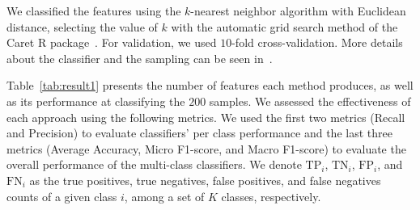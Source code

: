 We classified the features using the $k$-nearest neighbor algorithm with Euclidean distance, selecting the value of $k$ with the automatic grid search method of the Caret R package~\cite{kuhn2008building}.
For validation, we used $10$-fold cross-validation.
More details about the classifier and the sampling can be seen in~\cite{mitchell1997machine}.

Table~\ref{tab:result1} presents the number of features each method produces, as well as its performance at classifying the $200$ samples.
We assessed the effectiveness of each approach using the following metrics. We used the first two metrics (Recall and Precision) to evaluate classifiers' per class performance and the last three metrics (Average Accuracy, Micro F1-score, and Macro F1-score) to evaluate the overall performance of the multi-class classifiers. We denote $\text{TP}_i$, $\text{TN}_i$, $\text{FP}_i$, and $\text{FN}_i$ as the true positives, true negatives, false positives, and false negatives counts of a given class $i$, among a set of $K$ classes, respectively.
